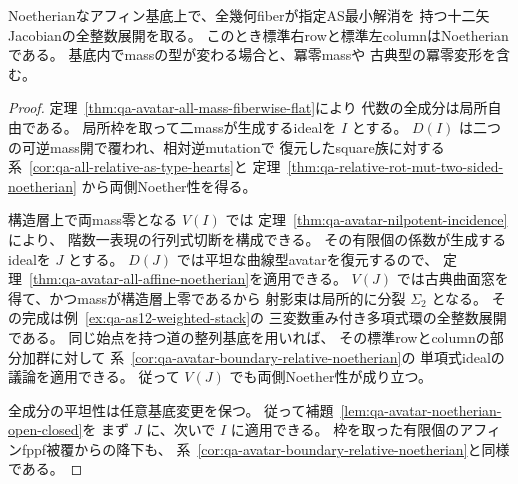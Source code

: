 \begin{corollary}[指定AS十二矢族の左右Noether性]
\label{cor:qa-avatar-presented-as-relative-noetherian}
Noetherianなアフィン基底上で、全幾何fiberが指定AS最小解消を
持つ十二矢Jacobianの全整数展開を取る。
このとき標準右rowと標準左columnはNoetherianである。
基底内でmassの型が変わる場合と、冪零massや
古典型の冪零変形を含む。
\end{corollary}
\begin{proof}
定理~\ref{thm:qa-avatar-all-mass-fiberwise-flat}により
代数の全成分は局所自由である。
局所枠を取って二massが生成するidealを $I$ とする。
$D(I)$ は二つの可逆mass開で覆われ、相対逆mutationで
復元したsquare族に対する
系~\ref{cor:qa-all-relative-as-type-hearts}と
定理~\ref{thm:qa-relative-rot-mut-two-sided-noetherian}
から両側Noether性を得る。

構造層上で両mass零となる $V(I)$ では
定理~\ref{thm:qa-avatar-nilpotent-incidence}により、
階数一表現の行列式切断を構成できる。
その有限個の係数が生成するidealを $J$ とする。
$D(J)$ では平坦な曲線型avatarを復元するので、
定理~\ref{thm:qa-avatar-all-affine-noetherian}を適用できる。
$V(J)$ では古典曲面窓を得て、かつmassが構造層上零であるから
射影束は局所的に分裂 $\Sigma_2$ となる。
その完成は例~\ref{ex:qa-as12-weighted-stack}の
三変数重み付き多項式環の全整数展開である。
同じ始点を持つ道の整列基底を用いれば、
その標準rowとcolumnの部分加群に対して
系~\ref{cor:qa-avatar-boundary-relative-noetherian}の
単項式idealの議論を適用できる。
従って $V(J)$ でも両側Noether性が成り立つ。

全成分の平坦性は任意基底変更を保つ。
従って補題~\ref{lem:qa-avatar-noetherian-open-closed}を
まず $J$ に、次いで $I$ に適用できる。
枠を取った有限個のアフィンfppf被覆からの降下も、
系~\ref{cor:qa-avatar-boundary-relative-noetherian}と同様である。
\end{proof}

